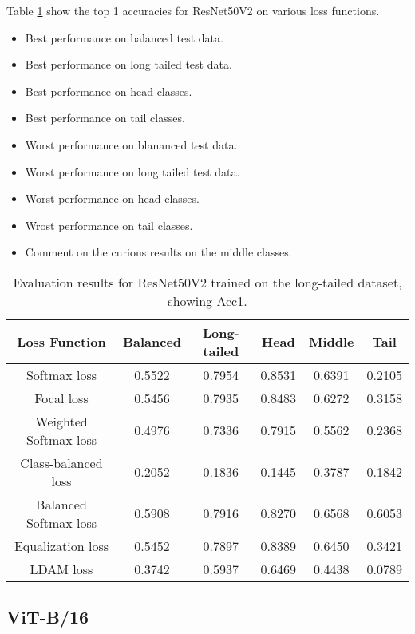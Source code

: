 Table \ref{tab:resnet_lt_acc1_1} show the top 1 accuracies for ResNet50V2 on various loss functions.

\begin{itemize}
    \item Best performance on balanced test data.
    \item Best performance on long tailed test data.
    \item Best performance on head classes.
    \item Best performance on tail classes.
    \item Worst performance on blananced test data.
    \item Worst performance on long tailed test data.
    \item Worst performance on head classes.
    \item Wrost performance on tail classes.
    \item Comment on the curious results on the middle classes.
\end{itemize}

\begin{table}[H]
    \centering
    \begin{tabular}{cccccc}
        \toprule
        Loss Function & Balanced & Long-tailed & Head & Middle & Tail \\ 
        \midrule
        Softmax loss   & 0.5522 & 0.7954 & 0.8531 & 0.6391 & 0.2105 \\
        Focal loss   & 0.5456 & 0.7935 & 0.8483 & 0.6272 & 0.3158 \\
        Weighted Softmax loss   & 0.4976 & 0.7336 & 0.7915 & 0.5562 & 0.2368 \\
        Class-balanced loss   & 0.2052 & 0.1836 &  0.1445 & 0.3787 & 0.1842 \\
        Balanced Softmax loss   & 0.5908 & 0.7916 & 0.8270 & 0.6568 & 0.6053 \\
        Equalization loss   & 0.5452 & 0.7897 & 0.8389 & 0.6450 & 0.3421 \\
        LDAM loss   & 0.3742 & 0.5937 & 0.6469 & 0.4438 & 0.0789 \\
        \bottomrule
    \end{tabular}
    \caption{Evaluation results for ResNet50V2 trained on the long-tailed dataset, showing Acc1.}
    \label{tab:resnet_lt_acc1_1}
\end{table}



\subsection{ViT-B/16}

